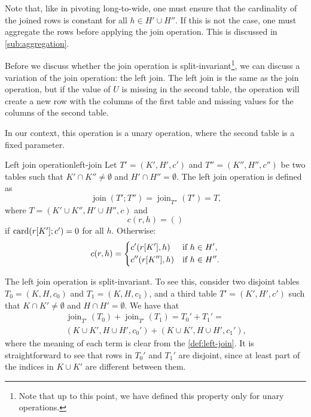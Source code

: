 Note that, like in pivoting long-to-wide, one must ensure that the cardinality of the
joined rows is constant for all $h \in H' \cup H''$.  If this is not the case, one must
aggregate the rows before applying the join operation.  This is discussed in
\cref{sub:aggregation}.

Before we discuss whether the join operation is split-invariant\footnote{Note that up to
this point, we have defined this property only for unary operations.}, we can discuss a
variation of the join operation: the left join.  The left join is the same as the join
operation, but if the value of $U$ is missing in the second table, the operation will
create a new row with the columns of the first table and missing values for the columns of
the second table.

In our context, this operation is a unary operation, where the second table is
a fixed parameter.

\begin{defbox}{Left join operation}{left-join}
  Let $T' = (K', H', c')$ and $T'' = (K'', H'', c'')$ be two tables such that $K'
  \cap K'' \neq \emptyset$ and $H' \cap H'' = \emptyset$.  The left join operation is
  defined as \[
    \operatorname{join}(T'; T'') = \operatorname{join}_{T''}(T') = T\text{,}
  \] where $T = (K' \cup K'', H' \cup H'', c)$ and \[
    c(r, h) = ()
  \] if $\rowcard[{r[K']; c'}] = 0$ for all $h$. Otherwise:
  \[
    c(r, h) = \begin{dcases}
      c'(r[K'], h) & \text{if } h \in H'\text{,} \\
      c''(r[K''], h) & \text{if } h \in H''\text{.}
    \end{dcases}
  \]
\end{defbox}

The left join operation is split-invariant.  To see this, consider two disjoint tables
$T_0 = (K, H, c_0)$ and $T_1 = (K, H, c_1)$, and a third table $T' = (K', H', c')$ such
that $K \cap K' \neq \emptyset$ and $H \cap H' = \emptyset$.  We have that
\begin{multline*}
  \operatorname{join}_{T'}(T_0) + \operatorname{join}_{T'}(T_1) =
  T_0' + T_1' =\\
    (K \cup K', H \cup H', c_0') + (K \cup K', H \cup H', c_1')\text{,}
\end{multline*}
where the meaning of each term is clear from the \cref{def:left-join}.
It is straightforward to see that rows in $T_0'$ and $T_1'$ are disjoint, since at least
part of the indices in $K \cup K'$ are different between them.

